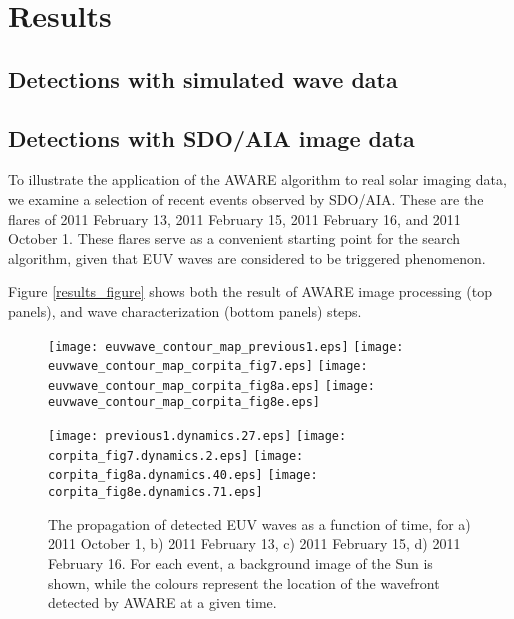 \section{Results}\label{sec:results}

\subsection{Detections with simulated wave data}

\subsection{Detections with SDO/AIA image data}

To illustrate the application of the AWARE algorithm to real solar imaging data, we examine a selection of recent events observed by SDO/AIA. These are the flares of 2011 February 13, 2011 February 15, 2011 February 16, and 2011 October 1. These flares serve as a convenient starting point for the search algorithm, given that EUV waves are considered to be triggered phenomenon. 

Figure \ref{results_figure} shows both the result of AWARE image processing (top panels), and wave characterization (bottom panels) steps. 

\begin{figure}
\begin{center}
\texttt{[image: euvwave\_contour\_map\_previous1.eps]}
\texttt{[image: euvwave\_contour\_map\_corpita\_fig7.eps]}
\texttt{[image: euvwave\_contour\_map\_corpita\_fig8a.eps]}
\texttt{[image: euvwave\_contour\_map\_corpita\_fig8e.eps]}

\texttt{[image: previous1.dynamics.27.eps]}
\texttt{[image: corpita\_fig7.dynamics.2.eps]}
\texttt{[image: corpita\_fig8a.dynamics.40.eps]}
\texttt{[image: corpita\_fig8e.dynamics.71.eps]}
\caption{The propagation of detected EUV waves as a function of time, for a) 2011 October 1, b) 2011 February 13, c) 2011 February 15, d) 2011 February 16. For each event, a background image of the Sun is shown, while the colours represent the location of the wavefront detected by AWARE at a given time.}
\end{center}
\end{figure}




